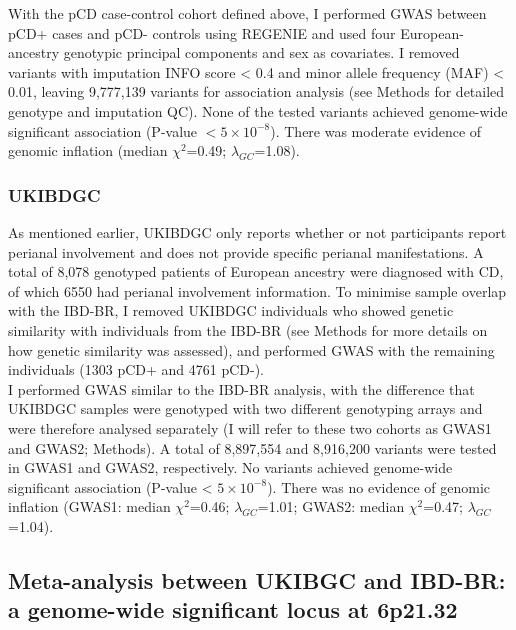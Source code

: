 With the pCD case-control cohort defined above, I performed GWAS between pCD+ cases and pCD- controls using REGENIE and used four European-ancestry genotypic principal components and sex as covariates. I removed variants with imputation INFO score < 0.4 and minor allele frequency (MAF) < 0.01, leaving 9,777,139 variants for association analysis (see Methods for detailed genotype and imputation QC). None of the tested variants achieved genome-wide significant association (P-value $< 5\times10^{-8}$). There was moderate evidence of genomic inflation (median $\chi^{2}$=0.49; $\lambda_{GC}$=1.08).
\subsubsection{UKIBDGC}
As mentioned earlier, UKIBDGC only reports whether or not participants report perianal involvement and does not provide specific perianal manifestations. A total of 8,078 genotyped patients of European ancestry were diagnosed with CD, of which 6550 had perianal involvement information. To minimise sample overlap with the IBD-BR, I removed UKIBDGC individuals who showed genetic similarity with individuals from the IBD-BR (see Methods for more details on how genetic similarity was assessed), and performed GWAS with the remaining individuals (1303 pCD+ and 4761 pCD-). \\

I performed GWAS similar to the IBD-BR analysis, with the difference that UKIBDGC samples were genotyped with two different genotyping arrays and were therefore analysed separately (I will refer to these two cohorts as GWAS1 and GWAS2; Methods). A total of 8,897,554 and 8,916,200 variants were tested in GWAS1 and GWAS2, respectively. No variants achieved genome-wide significant association (P-value < $5\times10^{-8}$). There was no evidence of genomic inflation (GWAS1: median $\chi^{2}$=0.46; $\lambda_{GC}$=1.01; GWAS2: median $\chi^{2}$=0.47; $\lambda_{GC}$=1.04).

\subsection{Meta-analysis between UKIBGC and IBD-BR: a genome-wide significant locus at 6p21.32}

